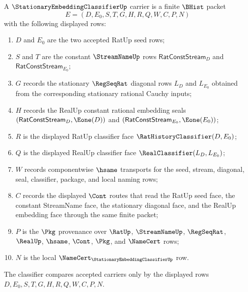 \begin{definition}
\label{def:stationary-embedding-classifier-carrier}
A $\StationaryEmbeddingClassifierUp$ carrier is a finite $\BHist$ packet
$$
E=(D,E_0,S,T,G,H,R,Q,W,C,P,N)
$$
with the following displayed rows:
\begin{enumerate}
\item $D$ and $E_0$ are the two accepted RatUp seed rows;
\item $S$ and $T$ are the constant $\StreamNameUp$ rows $\mathsf{RatConstStream}_D$ and $\mathsf{RatConstStream}_{E_0}$;
\item $G$ records the stationary $\RegSeqRat$ diagonal rows $L_D$ and $L_{E_0}$ obtained from the corresponding stationary rational Cauchy inputs;
\item $H$ records the RealUp constant rational embedding seals $(\mathsf{RatConstStream}_D,\Eone(D))$ and $(\mathsf{RatConstStream}_{E_0},\Eone(E_0))$;
\item $R$ is the displayed RatUp classifier face $\RatHistoryClassifier(D,E_0)$;
\item $Q$ is the displayed RealUp classifier face $\RealClassifier(L_D,L_{E_0})$;
\item $W$ records componentwise $\hsame$ transports for the seed, stream, diagonal, seal, classifier, package, and local naming rows;
\item $C$ records the displayed $\Cont$ routes that read the RatUp seed face, the constant StreamName face, the stationary diagonal face, and the RealUp embedding face through the same finite packet;
\item $P$ is the $\Pkg$ provenance over $\RatUp$, $\StreamNameUp$, $\RegSeqRat$, $\RealUp$, $\hsame$, $\Cont$, $\Pkg$, and $\NameCert$ rows;
\item $N$ is the local $\NameCert_{\StationaryEmbeddingClassifierUp}$ row.
\end{enumerate}
The classifier compares accepted carriers only by the displayed rows $D,E_0,S,T,G,H,R,Q,W,C,P,N$.
\end{definition}

